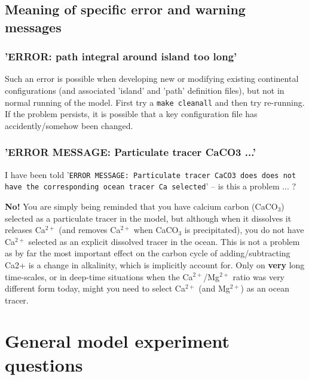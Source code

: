 \documentclass[11pt,fleqn]{book} %
\begin{document}
%
\newpage

\subsection{Meaning of specific error and warning messages}

\vspace{2mm}
\subsubsection{'ERROR: path integral around island too long'}

Such an error is possible when developing new or modifying existing continental configurations (and associated 'island' and 'path' definition files), but not in normal running of the model.
First try a \texttt{make cleanall} and then try re-running.
If the problem persists, it is possible that a key configuration file has accidently/somehow been changed.

\vspace{2mm}
\subsubsection{'ERROR MESSAGE: Particulate tracer CaCO3 ...'}

I have been told '\texttt{ERROR MESSAGE: Particulate tracer CaCO3 does does not have the corresponding ocean tracer Ca selected}' -- is this a problem ... ?

\textbf{No!} You are simply being reminded that you have calcium carbon (CaCO$_{3}$) selected as a particulate tracer in the model, but although when it dissolves it releases Ca$^{2+}$ (and removes Ca$^{2+}$ when CaCO$_{3}$ is precipitated), you do not have Ca$^{2+}$ selected as an explicit dissolved tracer in the ocean. This is not a problem as by far the most important effect on the carbon cycle of adding/subtracting Ca2+ is a change in alkalinity, which is implicitly account for. Only on \textbf{very} long time-scales, or in deep-time situations when the Ca$^{2+}$/Mg$^{2+}$ ratio was very different form today, might you need to select Ca$^{2+}$ (and Mg$^{2+}$) as an ocean tracer.


\newpage


\section{General model experiment questions}
\end{document}
